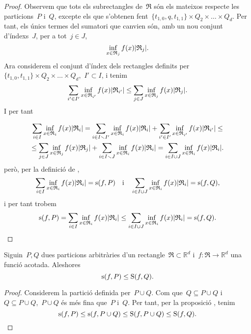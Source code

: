 \documentclass[../../Main.tex]{subfiles}
\begin{document}
\begin{proposition}
\begin{proof}
			Observem que tots els subrectangles de~\(\mathfrak{R}\) són els mateixos respecte les particions~\(P\) i~\(Q\), excepte els que s'obtenen fent~\(\{t_{1,0},q,t_{1,1}\}\times Q_{2}\times\dots\times Q_{d}\).
			Per tant, els únics termes del sumatori que canvien són, amb un nou conjunt d'índexs~\(J\), per a tot~\(j\in J\),
			\[
			    \inf_{x\in \mathfrak{R}_{j}}f(x)\abs{\mathfrak{R}_{j}}.
			\]
			Ara considerem el conjunt d'índex dels rectangles definits per~\(\{t_{1,0},t_{1,1}\}\times Q_{2}\times\dots\times Q_{d}\),~\(I'\subset I\), i tenim
			\[
			    \sum_{i'\in I'}\inf_{x\in \mathfrak{R}_{i'}}f(x)\abs{\mathfrak{R}_{i'}}\leq\sum_{j\in J}\inf_{x\in \mathfrak{R}_{j}}f(x)\abs{\mathfrak{R}_{j}}.
			\]
			I per tant%
				\begin{comment}
					\marginpar{Cut my life into pieces\\
					This is my last resort\\
					Suffocation\hfil\twonotes\hfil\\
					No breathing\\
					Don't give a fuck\\
					if I cut my arm, bleeding}
				\end{comment}
			\begin{multline*}
			\sum_{i\in I}\inf_{x\in \mathfrak{R}_{i}}f(x)\abs{\mathfrak{R}_{i}}=
			\sum_{i\in I\smallsetminus I'}\inf_{x\in \mathfrak{R}_{i}}f(x)\abs{\mathfrak{R}_{i}}+\sum_{i'\in I'}\inf_{x\in \mathfrak{R}_{i'}}f(x)\abs{\mathfrak{R}_{i'}}\leq\\
			\leq\sum_{j\in J}\inf_{x\in \mathfrak{R}_{j}}f(x)\abs{\mathfrak{R}_{j}}+\sum_{i\in I\smallsetminus J}\inf_{x\in \mathfrak{R}_{i}}f(x)\abs{\mathfrak{R}_{i}}
			=\sum_{i\in I\cup J}\inf_{x\in \mathfrak{R}_{i}}f(x)\abs{\mathfrak{R}_{i}}.
			\end{multline*}
			però, per la definició de ,
			\[
			    \sum_{i\in I}\inf_{x\in \mathfrak{R}_{i}}f(x)\abs{\mathfrak{R}_{i}}=\sinf(f,P)\quad\text{i}\quad\sum_{i\in I\cup J}\inf_{x\in \mathfrak{R}_{i}}f(x)\abs{\mathfrak{R}_{i}}=\sinf(f,Q),
			\]
			i per tant trobem
			\[
			    \sinf(f,P)=\sum_{i\in I}\inf_{x\in \mathfrak{R}_{i}}f(x)\abs{\mathfrak{R}_{i}}\leq\sum_{i\in I\cup J}\inf_{x\in \mathfrak{R}_{i}}f(x)\abs{\mathfrak{R}_{i}}=\sinf(f,Q).\qedhere
			\]
		\end{proof}
	\end{proposition}
	\begin{proposition}
		\label{prop:Sumes i finor de particions}
		Siguin~\(P,Q\) dues particions arbitràries d'un rectangle~\(\mathfrak{R}\subset\mathbb{R}^{d}\) i~\(f\colon\mathfrak{R}\to\mathbb{R}^{d}\) una funció acotada.
		Aleshores
		\[
		    \operatorname{s}(f,P)\leq\operatorname{S}(f,Q).
		\]
		\begin{proof}
			Considerem la partició definida per~\(P\cup Q\).
			Com que~\(Q\subseteq P\cup Q\) i~\(Q\subseteq P\cup Q\),~\(P\cup Q\) és més fina que~\(P\) i~\(Q\).
			Per tant, per la proposició , tenim
			\[
			    \operatorname{s}(f,P)\leq\operatorname{s}(f,P\cup Q)\leq\operatorname{S}(f,P\cup Q)\leq\operatorname{S}(f,Q).\qedhere
			\]
		\end{proof}
	\end{proposition}
\end{document}
